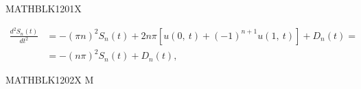 \documentclass[
  ukrainian,
]{article}
\begin{document}
MATHBLK1201X

\[
\begin{split} \frac{d^2S_n\left(t\right)}{dt^2} &= -\left(\pi n\right)^2S_n\left(t\right) + 2n\pi\left[u\left(0,\ t\right) + \left(-1\right)^{n+1}u\left(1,\ t\right)\right] + D_n\left(t\right) = \\ &= -\left(n\pi\right)^2S_n\left(t\right) + D_n\left(t\right), \end{split}
\]

MATHBLK1202X M
\end{document}
